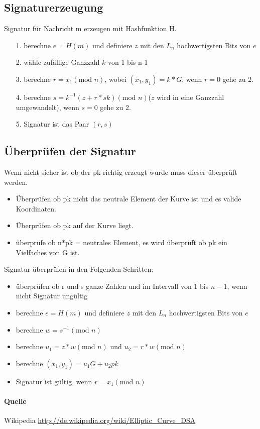 \documentclass{scrartcl}
\begin{document}
\subsection*{Signaturerzeugung}
Signatur für Nachricht m erzeugen mit Hashfunktion H.
\begin{itemize}
\item[1.] berechne $e = H(m)$ und definiere $z$ mit den $L_n$ hochwertigsten Bits von $e$
\item[2.] wähle zufällige Ganzzahl $k$ von 1 bis n-1
\item[3.] berechne $r = x_1 (\text{mod } n) $, wobei $(x_1, y_1) = k * G$, wenn $r = 0$ gehe zu 2.
\item[4.] berechne $s = k^{-1} ( z + r * sk) (\text{mod } n)$($z$ wird in eine Ganzzahl umgewandelt), wenn $s = 0$ gehe zu 2.
\item[5.] Signatur ist das Paar $(r,s)$
\end{itemize}

\subsection*{Überprüfen der Signatur}
Wenn nicht sicher ist ob der pk richtig erzeugt wurde muss dieser überprüft werden.
\begin{itemize}
\item Überprüfen ob pk nicht das neutrale Element der Kurve ist und es valide Koordinaten.
\item Überprüfen ob pk auf der Kurve liegt.
\item überprüfe ob n*pk = neutrales Element, es wird überprüft ob pk ein Vielfaches von G ist.
\end{itemize}

Signatur überprüfen in den Folgenden Schritten:
\begin{itemize}
\item überprüfen ob r und s ganze Zahlen und im Intervall von $1$ bis $n-1$, wenn nicht Signatur ungültig
\item berechne $e = H(m)$ und definiere $z$ mit den $L_n$ hochwertigsten Bits von $e$
\item berechne $w = s^{-1} (\text{mod } n)$
\item berechne $u_1 = z * w 	(\text{mod } n)$ und $u_2 = r * w (\text{mod } n)$
\item berechne $(x_1,y_1) = u_1 G + u_2 pk$
\item Signatur ist gültig, wenn $r = x_1 (\text{mod } n)$
\end{itemize}

\paragraph*{Quelle}
Wikipedia \url{http://de.wikipedia.org/wiki/Elliptic_Curve_DSA}
\end{document}
